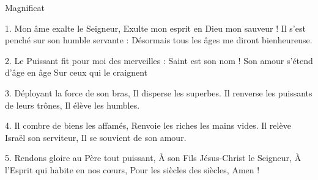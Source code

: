 Magnificat

1. Mon âme exalte le Seigneur,
Exulte mon esprit en Dieu mon sauveur !
Il s'est penché sur son humble servante :
Désormais tous les âges me diront bienheureuse.

2. Le Puissant fit pour moi des merveilles :
Saint est son nom !
Son amour s'étend d'âge en âge
Sur ceux qui le craignent

3. Déployant la force de son bras,
Il disperse les superbes.
Il renverse les puissants de leurs trônes,
Il élève les humbles.

4. Il combre de biens les affamés,
Renvoie les riches les mains vides.
Il relève Israël son serviteur,
Il se souvient de son amour.

5. Rendons gloire au Père tout puissant,
À son Fils Jésus-Christ le Seigneur,
À l'Esprit qui habite en nos cœurs,
Pour les siècles des siècles, Amen !
